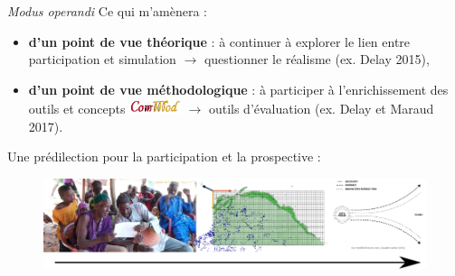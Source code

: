 \documentclass[newPxFont]{beamer}
\begin{document}
\begin{frame}{\textit{Modus operandi}}
  \vspace{-2em}
	Ce qui m'amènera :
	\vspace{-1em}
	\begin{itemize}
		\item \textbf{d'un point de vue théorique} : à continuer à explorer le lien entre participation et simulation $\rightarrow$ questionner le réalisme (ex. Delay 2015),
		\item \textbf{d'un point de vue méthodologique} : à participer à l'enrichissement des outils et concepts \includegraphics[width=1.5cm]{img/logo_commod} $\rightarrow$ outils d'évaluation (ex. Delay et Maraud 2017).
	\end{itemize}
	Une prédilection pour la participation et la prospective :
  \begin{figure}
   	\centering
   		\includegraphics[width=\textwidth]{img/prespective}
  \end{figure}

\end{frame}
\end{document}
